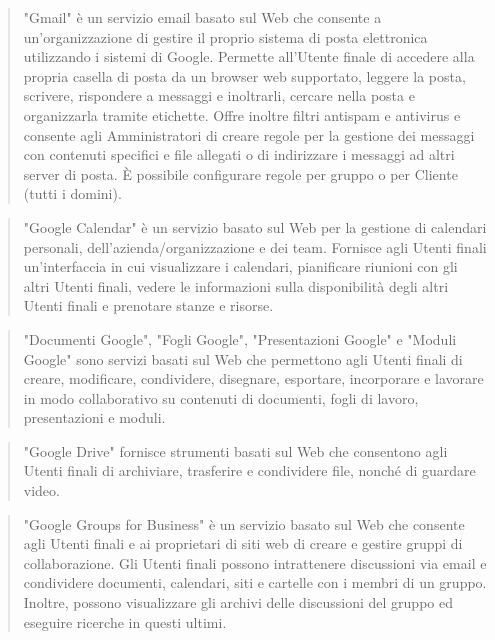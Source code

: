 \begin{quotation}\textenglish{"Gmail"} è un servizio email basato sul Web che consente a un'organizzazione di gestire il proprio sistema di posta elettronica utilizzando i sistemi di \textenglish{Google}. Permette all'Utente finale di accedere alla propria casella di posta da un browser web supportato, leggere la posta, scrivere, rispondere a messaggi e inoltrarli, cercare nella posta e organizzarla tramite etichette. Offre inoltre filtri antispam e antivirus e consente agli Amministratori di creare regole per la gestione dei messaggi con contenuti specifici e file allegati o di indirizzare i messaggi ad altri server di posta. È possibile configurare regole per gruppo o per Cliente (tutti i domini).
	\end{quotation}
\begin{quotation}
	\textenglish{"Google Calendar"} è un servizio basato sul Web per la gestione di calendari personali, dell'azienda/organizzazione e dei team. Fornisce agli Utenti finali un'interfaccia in cui visualizzare i calendari, pianificare riunioni con gli altri Utenti finali, vedere le informazioni sulla disponibilità degli altri Utenti finali e prenotare stanze e risorse.
\end{quotation}
\begin{quotation}
	"Documenti Google", "Fogli Google", "Presentazioni Google" e "Moduli \textenglish{Google}" sono servizi basati sul Web che permettono agli Utenti finali di creare, modificare, condividere, disegnare, esportare, incorporare e lavorare in modo collaborativo su contenuti di documenti, fogli di lavoro, presentazioni e moduli.
\end{quotation}
\begin{quotation}
	\textenglish{"Google Drive"} fornisce strumenti basati sul Web che consentono agli Utenti finali di archiviare, trasferire e condividere file, nonché di guardare video.
\end{quotation}
\begin{quotation}
	 \textenglish{"Google Groups for Business"} è un servizio basato sul Web che consente agli Utenti finali e ai proprietari di siti web di creare e gestire gruppi di collaborazione. Gli Utenti finali possono intrattenere discussioni via email e condividere documenti, calendari, siti e cartelle con i membri di un gruppo. Inoltre, possono visualizzare gli archivi delle discussioni del gruppo ed eseguire ricerche in questi ultimi.
\end{quotation}
